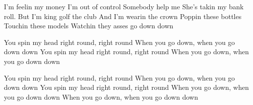 I’m feelin my money
I’m out of control
Somebody help me
She’s takin my bank roll.
But I’m king golf the club
And I’m wearin the crown
Poppin these bottles
Touchin these models
Watchin they asses go down down

You spin my head right round, right round
When you go down, when you go down down
You spin my head right round, right round
When you go down, when you go down down

You spin my head right round, right round
When you go down, when you go down down
You spin my head right round, right round
When you go down, when you go down down
When you go down, when you go down down

